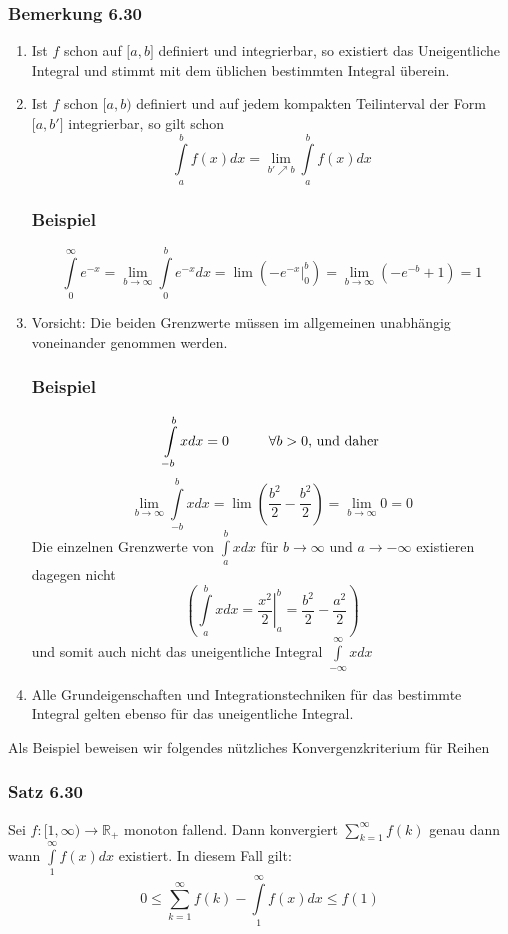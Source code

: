  \subsubsection*{Bemerkung 6.30}
\begin{enumerate}
\item Ist $f$ schon auf $\lbrack a,b\rbrack$ definiert und integrierbar, so existiert das Uneigentliche Integral und stimmt mit dem üblichen bestimmten Integral überein.
\item Ist $f$ schon $\lbrack a,b)$ definiert und auf jedem kompakten Teilinterval der Form $\lbrack a,b'\rbrack$ integrierbar, so gilt schon  \[\int\limits_a^b {f(x)dx = \mathop {\lim }\limits_{b' \nearrow b} } \int\limits_a^b {f(x)dx} \]
\subsubsection*{Beispiel}
\[\int\limits_0^\infty  {{e^{ - x}}}  = \mathop {\lim }\limits_{b \to \infty } \int\limits_{{0}}^b {{e^{ - x}}dx}  = \lim \left( {\left. { - {e^{ - x}}} \right|_{{0}}^b} \right) = \mathop {\lim }\limits_{b \to \infty } \left( { - {e^{ - b}} + 1} \right) = 1\]
\item Vorsicht: Die beiden Grenzwerte müssen im allgemeinen unabhängig voneinander genommen werden. 
\subsubsection*{Beispiel}
\[\int\limits_{ - b}^b {xdx = 0} \text{\hspace{10mm}}\forall b>0\text{, und daher}\]
\[\mathop {\lim }\limits_{b \to \infty } \int\limits_{ - b}^b {xdx = \lim \left( {\frac{{{b^2}}}{2} - \frac{{{b^2}}}{2}} \right) = \mathop {\lim }\limits_{b \to \infty } 0 = 0} \]
Die einzelnen Grenzwerte von $\int\limits_a^b {xdx} $ für $b\rightarrow \infty$ und $a\rightarrow -\infty$ existieren dagegen nicht \[\left( {\int\limits_a^b {xdx = \left. {\frac{{{x^2}}}{2}} \right|_a^b = \frac{{{b^2}}}{2} - \frac{{{a^2}}}{2}} } \right)\] und somit auch nicht das uneigentliche Integral $\int\limits_{ - \infty }^\infty  {xdx} $
\item Alle Grundeigenschaften und Integrationstechniken für das bestimmte Integral gelten ebenso für das uneigentliche Integral. 
\end{enumerate}
Als Beispiel beweisen wir folgendes nützliches Konvergenzkriterium für Reihen
\subsubsection*{Satz 6.30}
Sei $f:\lbrack 1,\infty )\rightarrow \mathbb{R}_+$ monoton fallend. Dann konvergiert $\sum\limits_{k = 1}^\infty  {f(k)}$ genau dann wann $\int\limits_1^\infty  {f(x)dx} $ existiert. In diesem Fall gilt: \[0 \le \sum\limits_{k = 1}^\infty  {f(k)}  - \int\limits_1^\infty  {f(x)dx}  \le f(1)\]
